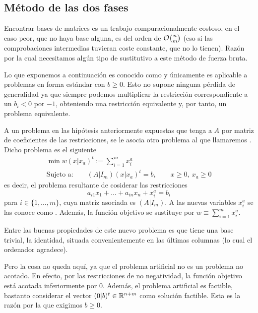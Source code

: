 \subsection{Método de las dos fases}
Encontrar bases de matrices es un trabajo compuracionalmente costoso, en el caso peor, que no haya base alguna, es del orden de $\mathcal{O}\binom{n}{m}$ (eso si las comprobaciones intermedias tuvieran coste constante, que no lo tienen). Razón por la cual necesitamos algún tipo de sustitutivo a este método de fuerza bruta.

Lo que exponemos a continuación es conocido como  y únicamente es aplicable a problemas en forma estándar con $b\geq 0$. Esto no supone ninguna pérdida de generalidad ya que siempre podemos multiplicar la restricción correspondiente a un $b_i<0$ por $-1$, obteniendo una restricción equivalente y, por tanto, un problema equivalente.

A un problema en las hipótesis anteriormente expuestas que tenga a $A$ por matriz de coeficientes de las restricciones, se le asocia otro problema al que llamaremos . Dicho problema es el siguiente
\begin{equation*}
	\begin{array}{c}
		\min w(x|x_a)^t:=\sum_{i=1}^{m}x_i^a\\
		\text{Sujeto a:}\qquad (A|I_m)(x|x_a)^t=b,\qquad x\geq 0,\ x_a\geq 0
	\end{array}
\end{equation*}
es decir, el problema resultante de cosiderar las restricciones
\begin{equation*}
	a_{i1}x_1+\dots+a_{in}x_n+x_i^a=b_i
\end{equation*}
para $i\in\{1,\dots,m\}$, cuya matriz asociada es $(A|I_m)$. A las nuevas variables $x_i^a$ se las conoce como . Además, la función objetivo se sustituye por $w\equiv \sum_{i=1}^{m}x_i^a$.

Entre las buenas propiedades de este nuevo problema es que tiene una base trivial, la identidad, situada convenientemente en las últimas columnas (lo cual el ordenador agradece).

Pero la cosa no queda aquí, ya que el problema artificial no es un problema no acotado. En efecto, por las restricciones de no negatividad, la función objetivo está acotada inferiormente por $0$. Además, el problema artificial es factible, bastanto considerar el vector $(0|b)^t\in\mathbb{R}^{n+m}$ como solución factible. Esta es la razón por la que exigimos $b\geq 0$.

